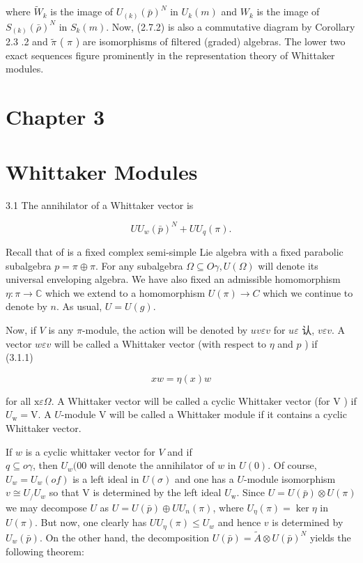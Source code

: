 \documentclass[10pt]{article}
\begin{document}
where $\tilde{W}_{k}$ is the image of $U_{(k)}(\bar{p})^{N}$ in $U_{k}(m)$ and $W_{k}$ is the image of $S_{(k)}(\bar{\rho})^{N}$ in $S_{k}(m)$. Now, (2.7.2) is also a commutative diagram by Corollary 2.3 .2 and $\tilde{\pi}$ ( $\pi$ ) are isomorphisms of filtered (graded) algebras. The lower two exact sequences figure prominently in the representation theory of Whittaker modules.

\section{Chapter 3}
\section{Whittaker Modules}
3.1 The annihilator of a Whittaker vector is

$$
U U_{w}(\bar{p})^{N}+U U_{q}(\pi) .
$$

Recall that of is a fixed complex semi-simple Lie algebra with a fixed parabolic subalgebra $p=\pi \oplus \pi$. For any subalgebra $\Omega \subseteq O \gamma, U(\Omega)$ will denote its universal enveloping algebra. We have also fixed an admissible homomorphism $\eta: \pi \rightarrow \mathbb{C}$ which we extend to a homomorphism $U(\pi) \rightarrow C$ which we continue to denote by $n$. As usual, $U=U(g)$.

Now, if $V$ is any $\pi$-module, the action will be denoted by $u v \varepsilon v$ for $u \varepsilon$ 认, $v \varepsilon v$. A vector $w \varepsilon v$ will be called a Whittaker vector (with respect to $\eta$ and $p$ ) if\\
(3.1.1)

$$
x w=\eta(x) w
$$

for all $\mathrm{x} \varepsilon \Omega$. A Whittaker vector will be called a cyclic Whittaker vector (for V ) if $U_{\mathrm{w}}=\mathrm{V}$. A $U$-module V will be called a Whittaker module if it contains a cyclic Whittaker vector.

If $w$ is a cyclic whittaker vector for $V$ and if\\
$q \subseteq o \gamma$, then $U_{w}(00$ will denote the annihilator of $w$ in $U(0)$. Of course, $U_{w}=U_{w}(o f)$ is a left ideal in $U(\sigma)$ and one has a $U$-module isomorphism $v \cong U_{/} U_{w}$ so that V is determined by the left ideal $U_{\mathrm{w}}$. Since $U=U(\bar{p}) \otimes U(\pi)$ we may decompose $U$ as $U=U(\bar{p}) \oplus U U_{n}(\pi)$, where $U_{\eta}(\pi)=\operatorname{ker} \eta$ in $U(\pi)$. But now, one clearly has $U U_{\eta}(\pi) \leq U_{w}$ and hence $v$ is determined by $U_{w}(\bar{p})$. On the other hand, the decomposition $U(\bar{p})=\tilde{A} \otimes U(\bar{p})^{N}$ yields the following theorem:
\end{document}
